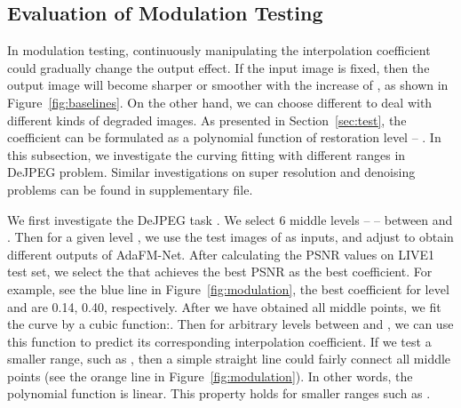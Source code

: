 \documentclass[10pt,twocolumn,letterpaper]{article}
\begin{document}
\subsection{Evaluation of Modulation Testing}
\label{sec:modulation}
In modulation testing, continuously manipulating the interpolation coefficient  could gradually change the output effect. If the input image is fixed, then the output image will become sharper or smoother with the increase of , as shown in Figure~\ref{fig:baselines}. On the other hand, we can choose different  to deal with different kinds of degraded images. As presented in Section~\ref{sec:test}, the coefficient  can be formulated as a polynomial function of restoration level  -- . In this subsection, we investigate the curving fitting with different ranges in DeJPEG problem. Similar investigations on super resolution and denoising problems can be found in supplementary file. 

We first investigate the DeJPEG task .
We select 6 middle levels --  -- between  and . Then for a given level , we use the test images of  as inputs, and adjust  to obtain different outputs of AdaFM-Net. After calculating the PSNR values on LIVE1 test set, we select the  that achieves the best PSNR as the best coefficient. For example, see the blue line in Figure~\ref{fig:modulation}, the best coefficient for level   and  are 0.14, 0.40, respectively. After we have obtained all middle points, we fit the curve by a cubic function:. Then for arbitrary levels between  and , we can use this function to predict its corresponding interpolation coefficient. If we test a smaller range, such as , then a simple straight line could fairly connect all middle points (see the orange line in Figure~\ref{fig:modulation}). In other words, the polynomial function is linear. This property holds for smaller ranges such as . 
\end{document}

